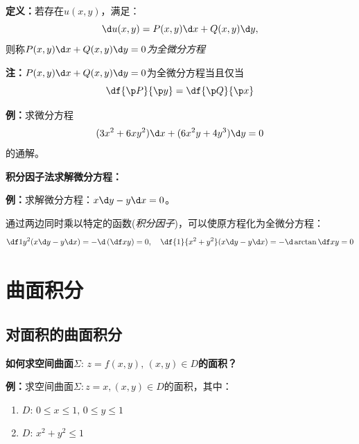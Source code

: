 {\bf 定义：}若存在$u(x,y)$，满足：
$$\d u(x,y)=P(x,y)\d x+Q(x,y)\d y,$$
则称{\it $P(x,y)\d x+Q(x,y)\d y=0$为全微分方程}

{\bf 注：}$P(x,y)\d x+Q(x,y)\d y=0$为全微分方程当且仅当
$$\df{\p P}{\p y}=\df{\p Q}{\p x}$$

{\bf 例：}求微分方程
$$(3x^2+6xy^2)\d x+(6x^2y+4y^3)\d y=0$$
的通解。

{\bf 积分因子法求解微分方程：}

{\bf 例：}求解微分方程：$x\d y-y\d x=0$。

通过两边同时乘以特定的函数({\it 积分因子})，可以使原方程化为全微分方程：
$${\df 1{y^2}}(x\d y-y\d x) =-\d\left(\df xy\right)
=0,\quad {\df{1}{x^2+y^2}}(x\d y-y\d x) =-\d\arctan\df xy=0$$

\section{曲面积分}

\subsection{对面积的曲面积分}

{\bf 如何求空间曲面$\Sigma:\,z=f(x,y),\,(x,y)\in D$的面积？}

{\bf 例：}求空间曲面$\Sigma:z=x,(x,y)\in D$的面积，其中：
\begin{enumerate}[(1)]
  \setlength{\itemindent}{1cm}
  \item $D:\,0\leq x\leq 1,\,0\leq y\leq 1$
  \item $D:\,x^2+y^2\leq 1$
\end{enumerate}

